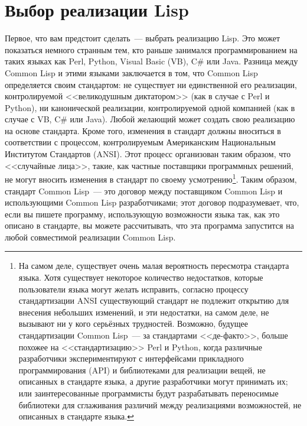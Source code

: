 \section{Выбор реализации Lisp}

Первое, что вам предстоит сделать~--- выбрать реализацию Lisp. Это может показаться
немного странным тем, кто раньше занимался программированием на таких языках как Perl,
Python, Visual Basic (VB), C\# или Java. Разница между Common Lisp и этими языками
заключается в том, что Common Lisp определяется своим стандартом: не существует ни
единственной его реализации, контролируемой <<великодушным диктатором>> (как в случае с Perl
и Python), ни канонической реализации, контролируемой одной компанией (как в случае с VB,
C\# или Java). Любой желающий может создать свою реализацию на основе стандарта. Кроме
того, изменения в стандарт должны вноситься в соответствии с процессом, контролируемым
Американским Национальным Институтом Стандартов (ANSI). Этот процесс организован таким
образом, что <<случайные лица>>, такие, как частные поставщики программных решений, не могут
вносить изменения в стандарт по своему усмотрению\footnote{На самом деле, существует очень
  малая вероятность пересмотра стандарта языка. Хотя существует некоторое количество
  недостатков, которые пользователи языка могут желать исправить, согласно процессу
  стандартизации ANSI существующий стандарт не подлежит открытию для внесения небольших
  изменений, и эти недостатки, на самом деле, не вызывают ни у кого серьёзных
  трудностей. Возможно, будущее стандартизации Common Lisp~--- за стандартами <<де-факто>>,
  больше похожее на <<стандартизацию>> Perl и Python, когда различные разработчики
  экспериментируют с интерфейсами прикладного программирования (API) и библиотеками для
  реализации вещей, не описанных в стандарте языка, а другие разработчики могут принимать
  их; или заинтересованные программисты будут разрабатывать переносимые библиотеки для
  сглаживания различий между реализациями возможностей, не описанных в стандарте
  языка.}. Таким образом, стандарт Common Lisp~--- это договор между поставщиком Common
Lisp и использующими Common Lisp разработчиками; этот договор подразумевает, что, если вы
пишете программу, использующую возможности языка так, как это описано в стандарте, вы
можете рассчитывать, что эта программа запустится на любой совместимой реализации Common
Lisp.

